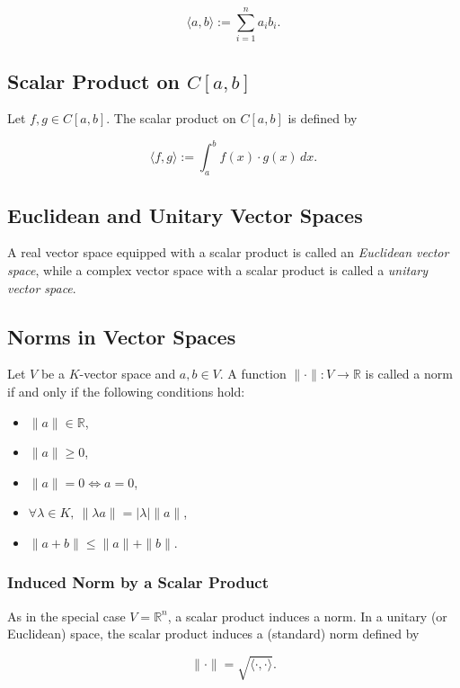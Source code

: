 \[
\langle a, b \rangle := \sum_{i=1}^n a_i b_i.
\]

\subsection{Scalar Product on \( C[a, b] \)}

Let \( f, g \in C[a, b] \). The scalar product on \( C[a, b] \) is defined by

\[
\langle f, g \rangle := \int_a^b f(x) \cdot g(x) \, dx.
\]

\subsection{Euclidean and Unitary Vector Spaces}

A real vector space equipped with a scalar product is called an \textit{Euclidean vector space}, while a complex vector space with a scalar product is called a \textit{unitary vector space}.

\subsection{Norms in Vector Spaces}

Let \( V \) be a \( K \)-vector space and \( a, b \in V \). A function \( \| \cdot \| : V \to \mathbb{R} \) is called a norm if and only if the following conditions hold:

\begin{itemize}[label=\(-\)]
    \item \( \|a\| \in \mathbb{R} \),
    \item \( \|a\| \geq 0 \),
    \item \( \|a\| = 0 \iff a = 0 \),
    \item \( \forall \lambda \in K, \ \| \lambda a \| = |\lambda| \| a \| \),
    \item \( \| a + b \| \leq \| a \| + \| b \| \).
\end{itemize}

\subsubsection{Induced Norm by a Scalar Product}

As in the special case \( V = \mathbb{R}^n \), a scalar product induces a norm.
In a unitary (or Euclidean) space, the scalar product induces a (standard) norm defined by

\[
\| \cdot \| = \sqrt{\langle \cdot, \cdot \rangle}.
\]

